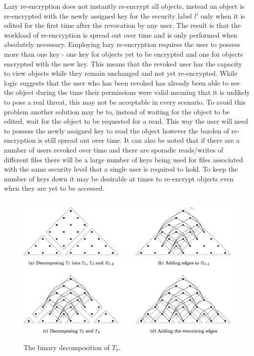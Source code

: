 \documentclass[12pt, titlepage]{article}
\begin{document}
\newline \indent Lazy re-encryption does not instantly re-encrypt all objects, instead an object is re-encrypted with the newly assigned key for the security label $l'$ only when it is edited for the first time after the revocation by any user. The result is that the workload of re-encryption is spread out over time and is only performed when absolutely necessary. Employing lazy re-encryption requires the user to possess more than one key - one key for objects yet to be encrypted and one for objects encrypted with the new key.\cite{lazyEncryption} This means that the revoked user has the capacity to view objects while they remain unchanged and not yet re-encrypted. While logic suggests that the user who has been revoked has already been able to see the object during the time their permissions were valid meaning that it is unlikely to pose a real threat, this may not be acceptable in every scenario. To avoid this problem another solution may be to, instead of waiting for the object to be edited, wait for the object to be requested for a read. This way the user will need to possess the newly assigned key to read the object however the burden of re-encryption is still spread out over time. It can also be noted that if there are a number of users revoked over time and there are sporadic reads/writes of different files there will be a large number of keys being used for files associated with the same security level that a single user is required to hold. To keep the number of keys down it may be desirable at times to re-encrypt objects even when they are yet to be accessed.

\begin{figure}
\centerline{\includegraphics[height=3.0in,width=6in,angle=0]{binarydecompo.pdf}}
\caption{The binary decomposition of $T_{7}$.\cite{mainPaper}}
\label{fig:binarydecomp}
\end{figure}
\end{document}
